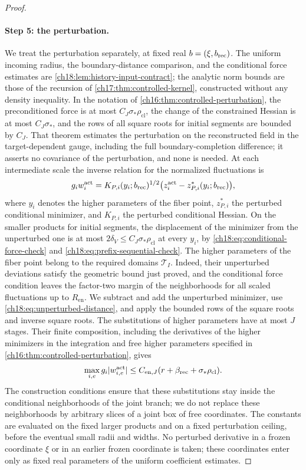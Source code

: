 \begin{proof}
\paragraph{Step 5: the perturbation.}
We treat the perturbation separately, at fixed real $b=(\xi,b_{\mathrm{rec}})$. The uniform incoming radius, the boundary-distance comparison, and the conditional force estimates are \cref{ch18:lem:history-input-contract}; the analytic norm bounds are those of the recursion of \cref{ch17:thm:controlled-kernel}, constructed without any density inequality. In the notation of \cref{ch16:thm:controlled-perturbation}, the preconditioned force is at most $C_J\sigma_*\rho_{\mathrm{cl}}$, the change of the constrained Hessian is at most $C_J\sigma_*$, and the rows of all square roots for initial segments are bounded by $C_J$. That theorem estimates the perturbation on the reconstructed field in the target-dependent gauge, including the full boundary-completion difference; it asserts no covariance of the perturbation, and none is needed. At each intermediate scale the inverse relation for the normalized fluctuations is
\[
 g_iw_i^{\mathrm{act}}
   =K_{P,i}(y_i;b_{\mathrm{rec}})^{1/2}
          \bigl(z_i^{\mathrm{act}}-z_{P,i}^*(y_i;b_{\mathrm{rec}})\bigr),
\]
where $y_i$ denotes the higher parameters of the fiber point, $z^*_{P,i}$ the perturbed conditional minimizer, and $K_{P,i}$ the perturbed conditional Hessian. On the smaller products for initial segments, the displacement of the minimizer from the unperturbed one is at most $2\delta_V\le C_J\sigma_*\rho_{\mathrm{cl}}$ at every $y_i$, by \eqref{ch18:eq:conditional-force-check} and \eqref{ch18:eq:prefix-sequential-check}. The higher parameters of the fiber point belong to the required domains $\mathcal T_I$. Indeed, their unperturbed deviations satisfy the geometric bound just proved, and the conditional force condition leaves the factor-two margin of the neighborhoods for all scaled fluctuations up to $R_{\mathrm{en}}$. We subtract and add the unperturbed minimizer, use \eqref{ch18:eq:unperturbed-distance}, and apply the bounded rows of the square roots and inverse square roots. The substitutions of higher parameters have at most $J$ stages. Their finite composition, including the derivatives of the higher minimizers in the integration and free higher parameters specified in \cref{ch16:thm:controlled-perturbation}, gives
\begin{equation}\label{ch18:eq:controlled-enclosure-proof}
 \max_{i,e}g_i\lvert w_{i,e}^{\mathrm{act}}\rvert
       \le C_{\mathrm{en},J}
             (r+\beta_{\mathrm{rec}}+\sigma_*\rho_{\mathrm{cl}}).
\end{equation}
The construction conditions ensure that these substitutions stay inside the conditional neighborhoods of the joint branch; we do not replace these neighborhoods by arbitrary slices of a joint box of free coordinates. The constants are evaluated on the fixed larger products and on a fixed perturbation ceiling, before the eventual small radii and widths. No perturbed derivative in a frozen coordinate $\xi$ or in an earlier frozen coordinate is taken; these coordinates enter only as fixed real parameters of the uniform coefficient estimates.


\end{proof}
